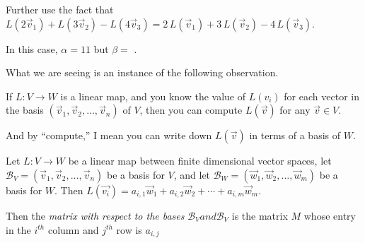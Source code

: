 \documentclass{ximera}
\begin{document}
\begin{question}
\begin{solution}
      \begin{hint}
        Further use the fact that $L(2\vec{v}_1)+L(3\vec{v}_2)-L(4\vec{v}_3) = 2 \, L(\vec{v}_1)+3\,L(\vec{v}_2)-4\,L(\vec{v}_3)$.
      \end{hint}

      In this case, $\alpha = 11$ but $\beta =$ .
    \end{solution}

    What we are seeing is an instance of the following observation.

    \begin{observation}
      If $L:V \to W$ is a linear map, and you know the value of $L(v_i)$ for each vector in the basis $(\vec{v}_1,\vec{v}_2,\ldots,\vec{v}_n)$ of $V$, 
      then you can compute $L(\vec{v})$ for any $\vec{v} \in V$.

      And by ``compute,'' I mean you can write down $L(\vec{v})$ in terms of a basis of $W$.
    \end{observation}

\end{question}

\begin{definition}
  Let $L:V \to W$ be a linear map between finite dimensional vector
  spaces, let $\mathcal{B}_V =(\vec{v}_1 ,\vec{v}_2,\ldots,\vec{v}_n) $
  be a basis for $V$, and let $\mathcal{B}_W =
  (\vec{w}_1,\vec{w}_2,\ldots,\vec{w}_m)$ be a basis for $W$.  Then
  $L(\vec{v_i}) = a_{i,1}\vec{w}_1+a_{i,2}\vec{w}_2 + \cdots +
  a_{i,m}\vec{w}_m$.

  Then the \textit{matrix with respect to the bases} $\mathcal{B}_V
  and \mathcal{B}_V$ is the matrix $M$ whose entry in the $i^{th}$
  column and $j^{th}$ row is $a_{i,j}$
\end{definition}
\end{document}
